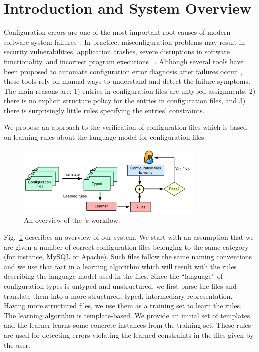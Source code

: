 \section{Introduction and System Overview}
\label{sec:Intro}

Configuration errors are one of the most important root-causes of
modern software system failures~\cite{xu15systems,yin11anempirical}.
In practice, misconfiguration problems may result in security
vulnerabilities, application crashes, severe disruptions in software
functionality, and incorrect program executions%
~\cite{xu15systems,zhang14encore,yuan11context}.  Although several
tools have been proposed to automate configuration error diagnosis
after failures occur~\cite{wang04automatic,attariyan10automating,
su07autobash,whitaker04configuration}, these tools rely on manual ways
  to understand and detect the failure symptoms. The main reasons are:
  1) entries in configuration files are untyped assignments, 2) there
  is no explicit structure policy for the entries in configuration
  files, and 3) there is surprisingly little rules specifying the
  entries' constraints.

We propose an approach to the verification of configuration files
which is based on learning rules about the language model for
configuration files.

\begin{figure}[t] \centering
\includegraphics[width=0.8\textwidth]{figs/overview}
\caption{An overview of the \app's workflow.}
\label{fig-overview}
\end{figure}

Fig.~\ref{fig-overview} describes an overview of our system. We start
with an assumption that we are given a number of correct configuration
files belonging to the same category (for instance, MySQL or
Apache). Such files follow the same naming conventions and we use that
fact in a learning algorithm which will result with the rules
describing the language model used in the files. Since the
``language'' of configuration types is untyped and unstructured, we
first parse the files and translate them into a more structured,
typed, intermediary representation. Having more structured files, we
use them as a training set to learn the rules. The learning algorithm
is template-based. We provide an initial set of templates and the
learner learns some concrete instances from the training set. These
rules are used for detecting errors violating the learned constraints
in the files given by the user.

